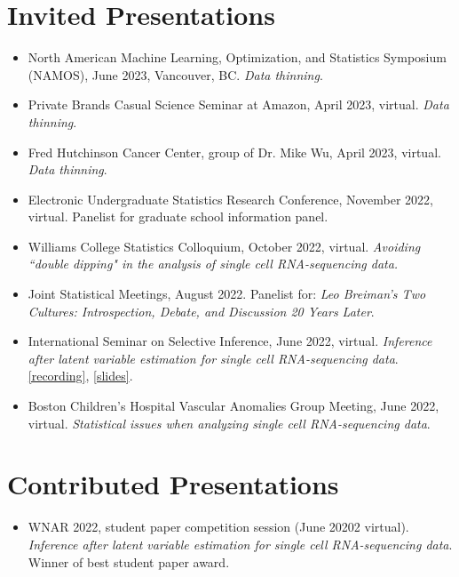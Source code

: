 \documentclass[margin, 10pt]{res} %
\begin{document}
\begin{resume}
\section{Invited Presentations} 
\begin{itemize}
\item North American Machine Learning, Optimization, and Statistics Symposium (NAMOS), June 2023, Vancouver, BC. \emph{Data thinning}. 
\item Private Brands Casual Science Seminar at Amazon, April 2023, virtual. \emph{Data thinning}. 
\item Fred Hutchinson Cancer Center, group of Dr. Mike Wu, April 2023, virtual. \emph{Data thinning}. 
\item Electronic Undergraduate Statistics Research Conference, November 2022, virtual. Panelist for graduate school information panel. 
\item Williams College Statistics Colloquium, October 2022, virtual. \emph{Avoiding ``double dipping" in the analysis of single cell RNA-sequencing data.} \item Joint Statistical Meetings, August 2022. Panelist for: \emph{Leo Breiman's Two Cultures: Introspection, Debate, and Discussion 20 Years Later}. 
\item International Seminar on Selective Inference, June 2022, virtual. \emph{Inference after latent variable estimation for single cell RNA-sequencing data}. \href{https://drive.google.com/file/d/1U4s7xiuz5yOCeDL2hjfIPZPbD7EsmINb/view}{[recording]}, \href{https://drive.google.com/file/d/1KPX8TkT85jHYalxhieyy65PAj18PRbFF/view}{[slides]}.
\item Boston Children's Hospital Vascular Anomalies Group Meeting, June 2022, virtual. \emph{Statistical issues when analyzing single cell RNA-sequencing data}. 
\end{itemize}
\section{Contributed Presentations} 
\begin{itemize}
\item WNAR 2022, student paper competition session (June 20202 virtual). \emph{Inference after latent variable estimation for single cell RNA-sequencing data}. Winner of best student paper award. 
\end{itemize}


\end{resume}
\end{document}
